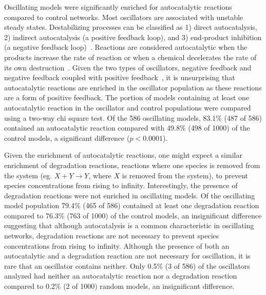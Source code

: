 \documentclass[12pt]{report}
\begin{document}
Oscillating models were significantly enriched for autocatalytic reactions compared to control networks. Most oscillators are associated with unstable steady states. Destabilizing processes can be classified as 1) direct autocatalysis, 2) indirect autocatalysis (a positive feedback loop), and 3) end-product inhibition (a negative feedback loop)~\cite{Tyson1975, tyson2007}. Reactions are considered autocatalytic when the products increase the rate of reaction or when a chemical decelerates the rate of its own destruction~\cite{Tyson2004}. Given the two types of oscillators, negative feedback and negative feedback coupled with positive feedback~\cite{Sauro_dynamics}, it is unsurprising that autocatalytic reactions are enriched in the oscillator population as these reactions are a form of positive feedback. The portion of models containing at least one autocatalytic reaction in the oscillator and control populations were compared using a two-way chi square test. Of the 586 oscillating models, 83.1\% (487 of 586) contained an autocatalytic reaction compared with 49.8\% (498 of 1000) of the control models, a significant difference ($p < 0.0001$). 

Given the enrichment of autocatalytic reactions, one might expect a similar enrichment of degradation reactions, reactions where one species is removed from the system (eg. $X + Y \to Y$, where $X$ is removed from the system), to prevent species concentrations from rising to infinity. Interestingly, the presence of degradation reactions were not enriched in oscillating models. Of the oscillating model population 79.4\% (465 of 586) contained at least one degradation reaction compared to 76.3\% (763 of 1000) of the control models, an insignificant difference suggesting that although autocatalysis is a common characteristic in oscillating networks, degradation reactions are not necessary to prevent species concentrations from rising to infinity.  Although the presence of both an autocatalytic and a degradation reaction are not necessary for oscillation, it is rare that an oscillator contains neither. Only 0.5\% (3 of 586) of the oscillators analyzed had neither an autocatalytic reaction nor a degradation reaction compared to 0.2\% (2 of 1000) random models, an insignificant difference.
\end{document}
